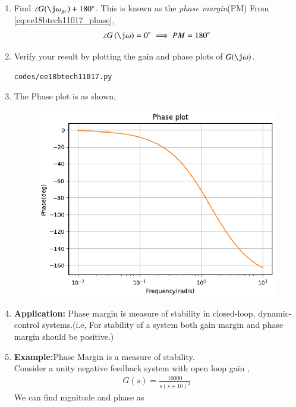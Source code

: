 \begin{enumerate}[label=\thesection.\arabic*.,ref=\thesection.\theenumi]
\item Find $\angle G(\j\omega_{gc}) + 180\degree$.  This is known as the {\em phase margin}(PM)
\solution From \eqref{eq:ee18btech11017_phase},
%
\begin{align}
\angle G\brak{\j\omega} = 0\degree
\implies PM=180\degree
\end{align}
%
\item Verify your result by plotting the gain and phase plots of $G(\j\omega)$.
\begin{lstlisting}
codes/ee18btech11017.py
\end{lstlisting}
\item
The Phase plot is as shown,
\begin{figure}[!h]
  \includegraphics[width=\columnwidth]{./figs/ee18btech11017/ee18btech11017.eps}
  \caption{}
  \label{fig:ee18btech11017}
\end{figure}
\item
\textbf{Application:} 
Phase margin is measure of stability in closed-loop, dynamic-control systems.(i.e, For stability of a system both gain margin and phase margin should be positive.)
\item
\textbf{Example:}Phase Margin is a measure of stability. \\
Consider a unity negative feedback system with open loop gain ,
\\
\begin{align}
G(s)=\frac{10000}{s(s+10)^{2}}
\label{eq:3} 
\end{align}
We can find mgnitude and phase as \\

\end{enumerate}
